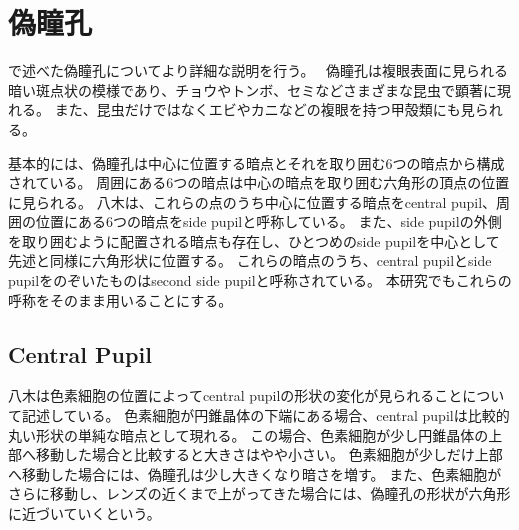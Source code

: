 \section{偽瞳孔}
\label{SPseudopupil}

で述べた偽瞳孔についてより詳細な説明を行う。　
偽瞳孔は複眼表面に見られる暗い斑点状の模様であり、チョウやトンボ、セミなどさまざまな昆虫で顕著に現れる。
また、昆虫だけではなくエビやカニなどの複眼を持つ甲殻類にも見られる。



基本的には、偽瞳孔は中心に位置する暗点とそれを取り囲む6つの暗点から構成されている。
周囲にある6つの暗点は中心の暗点を取り囲む六角形の頂点の位置に見られる。
八木\cite{yagi1951studies}は、これらの点のうち中心に位置する暗点をcentral pupil、周囲の位置にある6つの暗点をside pupilと呼称している。
また、side pupilの外側を取り囲むように配置される暗点も存在し、ひとつめのside pupilを中心として先述と同様に六角形状に位置する。
これらの暗点のうち、central pupilとside pupilをのぞいたものはsecond side pupilと呼称されている。
本研究でもこれらの呼称をそのまま用いることにする。

\subsection{Central Pupil}
\label{SSCentralPupil}

八木は色素細胞の位置によってcentral pupilの形状の変化が見られることについて記述している。
色素細胞が円錐晶体の下端にある場合、central pupilは比較的丸い形状の単純な暗点として現れる。
この場合、色素細胞が少し円錐晶体の上部へ移動した場合と比較すると大きさはやや小さい。
色素細胞が少しだけ上部へ移動した場合には、偽瞳孔は少し大きくなり暗さを増す。
また、色素細胞がさらに移動し、レンズの近くまで上がってきた場合には、偽瞳孔の形状が六角形に近づいていくという。

